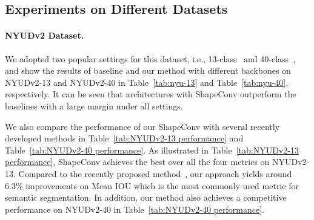 \subsection{Experiments on Different Datasets}
\vspace{-0.1cm}
\paragraph{NYUDv2 Dataset.} We adopted two popular settings for this dataset, i.e., 13-class~\cite{silberman2012indoor} and 40-class~\cite{gupta2013perceptual}, and show the results of baseline and our method with different backbones on NYUDv2-13 and NYUDv2-40 in Table~\ref{tab:nyu-13} and Table~\ref{tab:nyu-40}, respectively. 
It can be seen that architectures with ShapeConv outperform the baselines with a large margin under all settings.


We also compare the performance of our ShapeConv with several recently developed methods in Table~\ref{tab:NYUDv2-13 performance} and Table~\ref{tab:NYUDv2-40 performance}. As illustrated in Table~\ref{tab:NYUDv2-13 performance}, ShapeConv achieves the best over all the four metrics on NYUDv2-13. Compared to the recently proposed  method~\cite{zhao2018dense}, our approach yields around 6.3\% improvements on Mean IOU which is the most commonly used metric for semantic segmentation. In addition, our method also achieves a competitive performance on NYUDv2-40 in Table~\ref{tab:NYUDv2-40 performance}. 

\vspace{-0.2cm}
\begin{table}[h!]
 
   \caption{
        \label{tab:NYUDv2-13 performance}
        Performance comparison with other methods on NYUDv2-13 dataset.}
     \centering


\end{table} 

